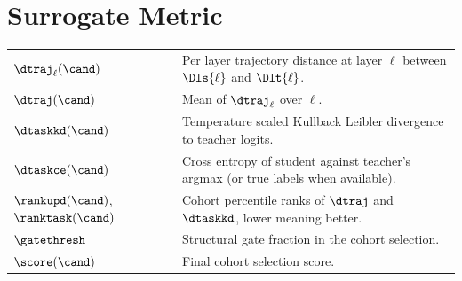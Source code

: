 \section*{Surrogate Metric}
\begin{tabular}{ll}
$\dtraj_{\ell}(\cand)$ & Per layer trajectory distance at layer $\ell$ between $\Dls{\ell}$ and $\Dlt{\ell}$. \\
$\dtraj(\cand)$ & Mean of $\dtraj_{\ell}$ over $\ell$. \\
$\dtaskkd(\cand)$ & Temperature scaled Kullback Leibler divergence to teacher logits. \\
$\dtaskce(\cand)$ & Cross entropy of student against teacher's argmax (or true labels when available). \\
$\rankupd(\cand)$, $\ranktask(\cand)$ & Cohort percentile ranks of $\dtraj$ and $\dtaskkd$, lower meaning better. \\
$\gatethresh$ & Structural gate fraction in the cohort selection. \\
$\score(\cand)$ & Final cohort selection score. \\
\end{tabular}
